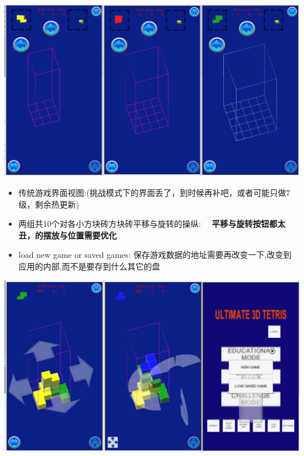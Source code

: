\documentclass[9pt, b5paper]{article}
\begin{document}
\includegraphics[width=.9\linewidth]{./pic/readme_20222007_193727.png}

\begin{itemize}
\item 传统游戏界面视图:(挑战模式下的界面丢了，到时候再补吧，或者可能只做7级，剩余热更新)
\item 两组共10个对各小方块砖方块砖平移与旋转的操纵:　 \textbf{平移与旋转按钮都太丑，的摆放与位置需要优化}
\item load new game or saved games: 保存游戏数据的地址需要再改变一下,改变到应用的内部,而不是要存到什么其它的盘
\end{itemize}

\includegraphics[width=.9\linewidth]{./pic/readme_20221007_195217.png}
\end{document}
